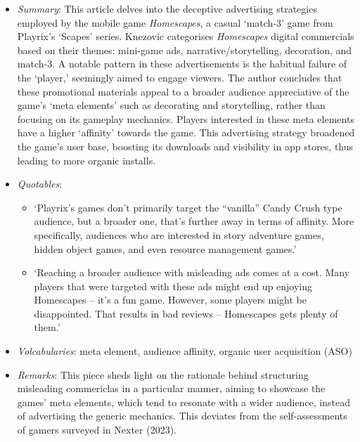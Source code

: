 \documentclass[a4paper, 12pt, mla]{homework}
\begin{document}
\begin{abibliography}
	\begin{itemize}
		\item \textit{Summary}:
			This article delves into the deceptive advertising strategies employed by the mobile game \textit{Homescapes}, a casual `match-3' game from Playrix's `Scapes' series. 
			Knezovic categorises \textit{Homescapes} digital commercials based on their themes: mini-game ads, narrative/storytelling, decoration, and match-3. 
			A notable pattern in these advertisements is the habitual failure of the `player,' seemingly aimed to engage viewers. 
			The author concludes that these promotional materials appeal to a broader audience appreciative of the game's `meta elements' such as decorating and storytelling, rather than focusing on its gameplay mechanics. 
			Players interested in these meta elements have a higher `affinity' towards the game. 
			This advertising strategy broadened the game's user base, boosting its downloads and visibility in app stores, thus leading to more organic installs.
		\item \textit{Quotables}:
			\begin{itemize}
				\item `Playrix’s games don’t primarily target the ``vanilla'' Candy Crush type audience, but a broader one, that’s further away in terms of affinity. More specifically, audiences who are interested in story adventure games, hidden object games, and even resource management games.'
				\item `Reaching a broader audience with misleading ads comes at a cost. Many players that were targeted with these ads might end up enjoying Homescapes -- it’s a fun game. However, some players might be disappointed. That results in bad reviews -- Homescapes gets plenty of them.'
			\end{itemize}
		\item \textit{Volcabularies}: meta element, audience affinity, organic user acquisition (ASO)
		\item \textit{Remarks}:
			This piece sheds light on the rationale behind structuring misleading commericlas in a particular manner, aiming to showcase the games' meta elements, which tend to resonate with a wider audience, instead of advertising the generic mechanics.
			This deviates from the self-assessments of gamers surveyed in Nexter (2023).
	\end{itemize}



\end{abibliography}
\end{document}
